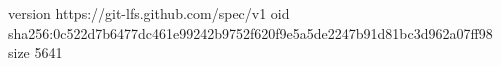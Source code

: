 version https://git-lfs.github.com/spec/v1
oid sha256:0c522d7b6477dc461e99242b9752f620f9e5a5de2247b91d81bc3d962a07ff98
size 5641
